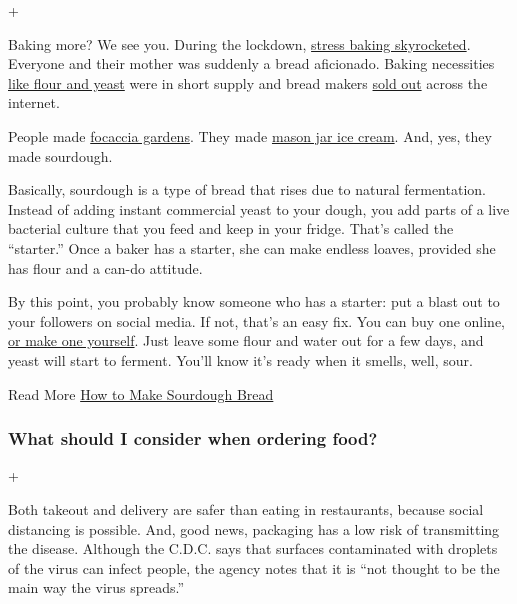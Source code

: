 +

Baking more? We see you. During the lockdown,
\href{https://www.nytimes3xbfgragh.onion/2020/03/30/style/bread-baking-coronavirus.html}{stress
baking skyrocketed}. Everyone and their mother was suddenly a bread
aficionado. Baking necessities
\href{https://www.washingtonpost.com/news/voraciously/wp/2020/03/24/people-are-baking-bread-like-crazy-and-now-were-running-out-of-flour-and-yeast/}{like
flour and yeast} were in short supply and bread makers
\href{https://people.com/food/bread-makers-viral-amazon/}{sold out}
across the internet.

People made
\href{https://www.nytimes3xbfgragh.onion/2020/04/24/dining/focaccia-bread.html}{focaccia
gardens}. They made
\href{https://www.nytimes3xbfgragh.onion/2020/05/09/at-home/virus-make-ice-cream-in-a-mason-jar.html}{mason
jar ice cream}. And, yes, they made sourdough.

Basically, sourdough is a type of bread that rises due to natural
fermentation. Instead of adding instant commercial yeast to your dough,
you add parts of a live bacterial culture that you feed and keep in your
fridge. That's called the ``starter.'' Once a baker has a starter, she
can make endless loaves, provided she has flour and a can-do attitude.

By this point, you probably know someone who has a starter: put a blast
out to your followers on social media. If not, that's an easy fix. You
can buy one online,
\href{https://www.kingarthurflour.com/recipes/sourdough-starter-recipe}{or
make one yourself}. Just leave some flour and water out for a few days,
and yeast will start to ferment. You'll know it's ready when it smells,
well, sour.

 Read More
\href{https://cooking.nytimes3xbfgragh.onion/guides/59-how-to-make-sourdough-bread}{How
to Make Sourdough Bread}

\hypertarget{what-should-i-consider-when-ordering-food}{%
\subsubsection{What should I consider when ordering
food?}\label{what-should-i-consider-when-ordering-food}}

+

Both takeout and delivery are safer than eating in restaurants, because
social distancing is possible. And, good news, packaging has a low risk
of transmitting the disease. Although the C.D.C. says that surfaces
contaminated with droplets of the virus can infect people, the agency
notes that it is ``not thought to be the main way the virus spreads.''

